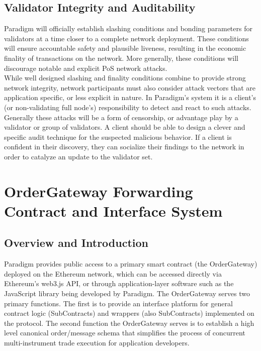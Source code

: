 \documentclass[9pt]{article}
\begin{document}
\subsection{Validator Integrity and Auditability}\label{integrity}
\noindent Paradigm will officially establish slashing conditions and bonding parameters for validators at a time closer to a complete network deployment. These conditions will ensure accountable safety and plausible liveness, resulting in the economic finality of transactions on the network. More generally, these conditions will discourage notable and explicit PoS network attacks. \\

\noindent While well designed slashing and finality conditions combine to provide strong network integrity, network participants must also consider attack vectors that are application specific, or less explicit in nature. In Paradigm’s system it is a client’s (or non-validating full node’s) responsibility to detect and react to such attacks. Generally these attacks will be a form of censorship, or advantage play by a validator or group of validators. A client should be able to design a clever and specific audit technique for the suspected malicious behavior. If a client is confident in their discovery, they can socialize their findings to the network in order to catalyze an update to the validator set.

\clearpage
\pagebreak


\section{OrderGateway Forwarding Contract and Interface System}\label{contracts}

\subsection{Overview and Introduction}
\noindent Paradigm provides public access to a primary smart contract (the OrderGateway) deployed on the Ethereum network, which can be accessed directly via Ethereum’s web3.js API, or through application-layer software such as the JavaScript library being developed by Paradigm. The OrderGateway serves two primary functions. The first is to provide an interface platform for general contract logic (SubContracts) and wrappers (also SubContracts) implemented on the protocol. The second function the OrderGateway serves is to establish a high level canonical order/message schema that simplifies the process of concurrent multi-instrument trade execution for application developers. \\
\end{document}
